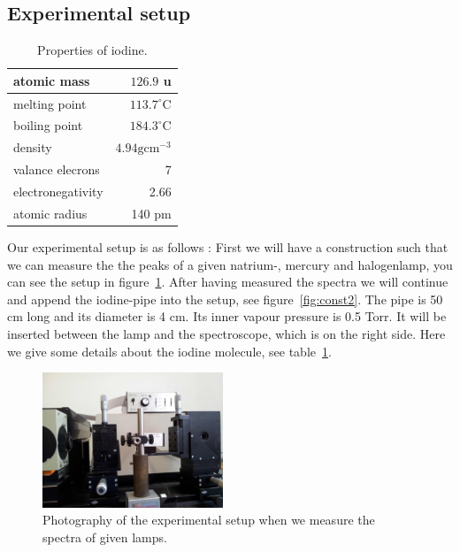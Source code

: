 \subsection{Experimental setup}
\begin{table}
\caption{Properties of iodine.}
\begin{tabular}{| l | r |}
    \hline
    atomic mass   & $126.9$ u \\
    \hline
    melting point & $113.7^{\circ}$C \\
    \hline
    boiling point & $184.3^{\circ}$C \\ 
    \hline
    density & $4.94 \text{gcm}^{-3} $ \\
    \hline
    valance elecrons & 7 \\
    \hline
    electronegativity & 2.66 \\
    \hline
    atomic radius & 140 pm \\
    \hline
\end{tabular}
\label{tab:iodine}
\end{table}


Our experimental setup is as follows \cite{versuchsanleitung}:
First we will have a construction such that we can measure the 
the peaks of a given natrium-, mercury and halogenlamp, you 
can see the setup in figure~\ref{fig:const1}.
After having measured the spectra we will continue and append
the iodine-pipe into the setup, see figure~\ref{fig:const2}.
The pipe is 50 cm long and its diameter is 4 cm. Its inner 
vapour pressure is 0.5 Torr. It will be 
inserted between the lamp and the spectroscope, which is on 
the right side. Here we give some details \cite{weisstein} 
about the iodine molecule, see table~\ref{tab:iodine}.

\begin{figure}
  \begin{center}
    \includegraphics[width=0.48\textwidth]{pics/const1}
  \end{center}
\caption{Photography of the experimental setup when we measure
    the spectra of given lamps.} 
 \label{fig:const1}

\end{figure}
